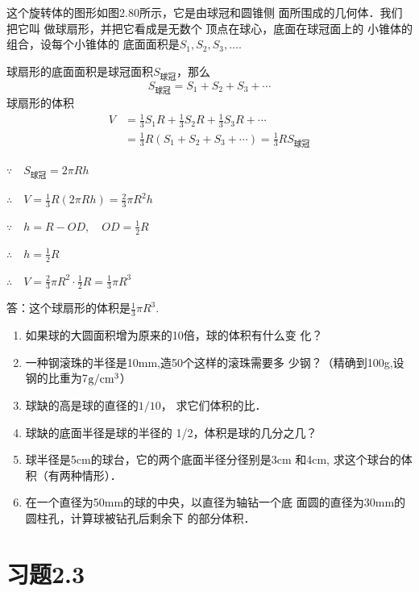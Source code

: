 \begin{solution}
    这个旋转体的图形如图2.80所示，它是由球冠和圆锥侧
面所围成的几何体．我们把它叫
做球扇形，并把它看成是无数个
顶点在球心，底面在球冠面上的
小锥体的组合，设每个小锥体的
底面面积是$S_1,S_2,S_3,\ldots$. 

球扇形的底面面积是球冠面积$S_{\text{球冠}}$，那么
\[S_{\text{球冠}}=S_1+S_2+S_3+\cdots\]
球扇形的体积
\[\begin{split}
    V&=\frac{1}{3}S_1R+\frac{1}{3}S_2R+\frac{1}{3}S_3R+\cdots\\
&=\frac{1}{3}R(S_1+S_2+S_3+\cdots)=\frac{1}{3}RS_{\text{球冠}}
\end{split}    
\]

$\because\quad S_{\text{球冠}}=2\pi Rh$

$\therefore\quad V=\frac{1}{3}R(2\pi Rh)=\frac{2}{3}\pi R^2h$

$\because\quad h=R-OD,\quad OD=\frac{1}{2}R$

$\therefore\quad h=\frac{1}{2}R$

$\therefore\quad V=\frac{2}{3}\pi R^2\cdot \frac{1}{2}R=\frac{1}{3}\pi R^3$

答：这个球扇形的体积是$\frac{1}{3}\pi R^3$.
\end{solution}



\begin{ex}
\begin{enumerate}
    \item 如果球的大圆面积增为原来的10倍，球的体积有什么变
    化？
    \item 一种钢滚珠的半径是10mm,造50个这样的滚珠需要多
    少钢？（精确到100g,设钢的比重为7${\rm g/cm^3}$）
    \item 球缺的高是球的直径的$1/10$，
    求它们体积的比．
    \item 球缺的底面半径是球的半径的
    1/2，体积是球的几分之几？
    \item 球半径是5cm的球台，它的两个底面半径分径别是3cm
    和4cm, 求这个球台的体积（有两种情形）．
    \item 在一个直径为50mm的球的中央，以直径为轴钻一个底
    面圆的直径为30mm的圆柱孔，计算球被钻孔后剩余下
    的部分体积．
\end{enumerate}
\end{ex}

\section*{习题2.3}

